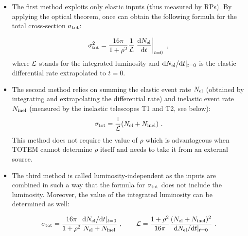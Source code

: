 \documentclass{desyproc}
\def\der{{\rm d}}
\begin{document}
\begin{itemize}

\item The first method exploits only elastic inputs (thus measured by RPs). By applying the optical theorem, once can obtain the following formula for the total cross-section $\sigma_{\rm tot}$:

\begin{equation}\label{eq:si tot m1}
\sigma_{\rm tot}^2 = {16\pi\over 1+\rho^2} {1\over {\cal L}} \left. {\der N_{\rm el}\over \der t}\right |_{t = 0}\ ,
\end{equation}
where ${\cal L}$ stands for the integrated luminosity and $\der N_{\rm el}/\der t|_{t = 0}$ is the elastic differential rate extrapolated to $t = 0$.

\eject

\item The second method relies on summing the elastic event rate $N_{\rm el}$ (obtained by integrating and extrapolating the differential rate) and inelastic event rate $N_{\rm inel}$ (measured by the inelastic telescopes T1 and T2, see below):
\begin{equation}\label{eq:si tot m2}
\sigma_{\rm tot} = {1\over {\cal L}} (N_{\rm el} + N_{\rm inel})\ .
\end{equation}
This method does not require the value of $\rho$ which is advantageous when TOTEM cannot determine $\rho$ itself and needs to take it from an external source.

\item The third method is called luminosity-independent as the inputs are combined in such a way that the formula for $\sigma_{\rm tot}$ does not include the luminosity. Moreover, the value of the integrated luminosity can be determined as well:

\begin{equation}\label{eq:si tot m3}
\sigma_{\rm tot} = {16\pi\over 1+\rho^2} {\der N_{\rm el}/ \der t |_{t = 0}\over N_{\rm el} + N_{\rm inel} }\ ,\qquad
{\cal L} = {1+\rho^2\over 16\pi} {( N_{\rm el} + N_{\rm inel})^2 \over \der N_{\rm el}/ \der t |_{t = 0}}\ .
\end{equation}

\end{itemize}
\end{document}
